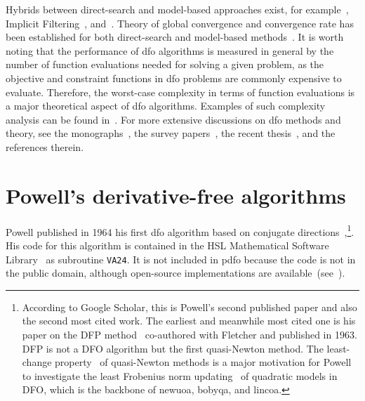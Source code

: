 \documentclass[
    smallextended,  %
    final,          %
]{svjour3}
\begin{document}
Hybrids between direct-search and model-based approaches exist, for example~\cite{Custodio_Vicente_2007}, Implicit Filtering~\cite[Algorithm~4.7]{Kelley_2011}, and~\cite{Conn_Digabel_2013}.
Theory of global convergence and convergence rate has been established for both direct-search and
model-based methods~\cite{Torczon_1997,Conn_Scheinberg_Toint_1997a,Kolda_Lewis_Torczon_2003,Conn_Scheinberg_Vicente_2009a,Powell_2012,Vicente_2013,Dodangeh_Vicente_2016,Garmanjani_Judice_Vicente_2016}.
It is worth noting that the performance of \gls{dfo} algorithms is measured in general by the number of function evaluations needed for solving a given problem, as the objective and constraint functions in \gls{dfo} problems are commonly
expensive to evaluate.
Therefore, the worst-case complexity in terms of function evaluations is a major theoretical aspect of \gls{dfo} algorithms.
Examples of such complexity analysis can be found in~\cite{Vicente_2013,Gratton_Etal_2015,Dodangeh_Vicente_2016,Dodangeh_Vicente_Zhang_2016}.
For more extensive discussions on \gls{dfo} methods and theory, see the monographs~\cite{Conn_Scheinberg_Vicente_2009b,Audet_Hare_2017}, the survey
papers~\cite{Rios_Sahinidis_2013,Custodio_Scheinberg_Vicente_2017,Larson_Menickelly_Wild_2019}, the recent thesis~\cite{Ragonneau_2022}, and the references therein.

\section{Powell's derivative-free algorithms}
\label{sec:powell}

Powell published in 1964 his first \gls{dfo} algorithm based on conjugate
directions~\cite{Powell_1964},\footnote{According to Google Scholar, this is Powell's second published paper and also the second most cited work.
The earliest and meanwhile most cited one is his paper on the DFP method~\cite{Fletcher_Powell_1963}
co-authored with Fletcher and published in 1963. DFP is not a DFO algorithm but the first
quasi-Newton method. The least-change property~\cite{Dennis_Schnabel_1979} of quasi-Newton methods
is a major motivation for Powell to investigate the least Frobenius norm updating~\cite{Powell_2004b}
of quadratic models in DFO, which is the backbone of \gls{newuoa}, \gls{bobyqa}, and \gls{lincoa}.}.
His code for this algorithm is contained in the HSL Mathematical Software Library~\cite{HSL} as subroutine \texttt{VA24}.
It is not included in \gls{pdfo} because the code is not in the public domain, although open-source implementations are available~(see~\cite[footnote~4]{Conn_Scheinberg_Toint_1997b}).
\end{document}
